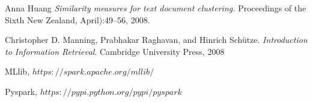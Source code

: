\documentclass[fleqn,10pt]{SelfArx} %
\begin{document}
\begin{thebibliography}{9}
Anna Huang
\textit{Similarity measures for text document clustering.} 
Proceedings of the Sixth New Zealand, April):49–56, 2008. 

 
Christopher D. Manning, Prabhakar Raghavan, and Hinrich Schütze.
\textit{Introduction to Information Retrieval}.  
Cambridge University Press, 2008
 
MLlib,
$https://spark.apache.org/mllib/$

Pyspark,
$https://pypi.python.org/pypi/pyspark$ 

\end{thebibliography}

\end{document}
